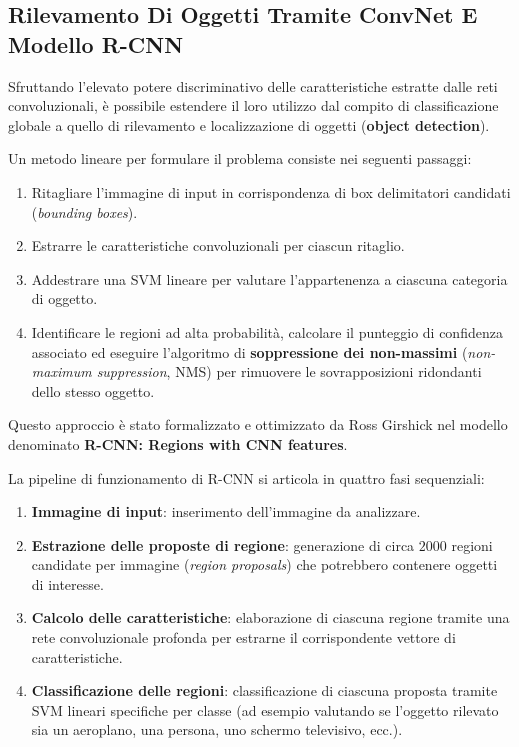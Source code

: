 ﻿\documentclass[11pt, a4paper]{article}
\begin{document}
\subsection{Rilevamento Di Oggetti Tramite ConvNet E Modello R-CNN}

Sfruttando l'elevato potere discriminativo delle caratteristiche estratte dalle reti convoluzionali, è possibile estendere il loro utilizzo dal compito di classificazione globale a quello di rilevamento e localizzazione di oggetti (\textbf{object detection}).

Un metodo lineare per formulare il problema consiste nei seguenti passaggi:
\begin{enumerate}
    \item Ritagliare l'immagine di input in corrispondenza di box delimitatori candidati (\emph{bounding boxes}).
    \item Estrarre le caratteristiche convoluzionali per ciascun ritaglio.
    \item Addestrare una SVM lineare per valutare l'appartenenza a ciascuna categoria di oggetto.
    \item Identificare le regioni ad alta probabilità, calcolare il punteggio di confidenza associato ed eseguire l'algoritmo di \textbf{soppressione dei non-massimi} (\emph{non-maximum suppression}, NMS) per rimuovere le sovrapposizioni ridondanti dello stesso oggetto.
\end{enumerate}

Questo approccio è stato formalizzato e ottimizzato da Ross Girshick nel modello denominato \textbf{R-CNN: Regions with CNN features}.


La pipeline di funzionamento di R-CNN si articola in quattro fasi sequenziali:
\begin{enumerate}
    \item \textbf{Immagine di input}: inserimento dell'immagine da analizzare.
    \item \textbf{Estrazione delle proposte di regione}: generazione di circa $2000$ regioni candidate per immagine (\emph{region proposals}) che potrebbero contenere oggetti di interesse.
    \item \textbf{Calcolo delle caratteristiche}: elaborazione di ciascuna regione tramite una rete convoluzionale profonda per estrarne il corrispondente vettore di caratteristiche.
    \item \textbf{Classificazione delle regioni}: classificazione di ciascuna proposta tramite SVM lineari specifiche per classe (ad esempio valutando se l'oggetto rilevato sia un aeroplano, una persona, uno schermo televisivo, ecc.).
\end{enumerate}
\end{document}
